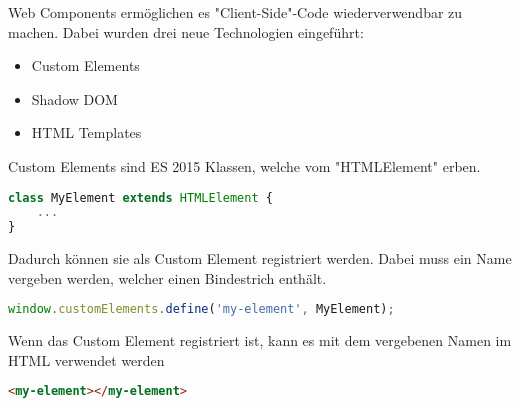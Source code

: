 

Web Components ermöglichen es "Client-Side"-Code wiederverwendbar zu machen. Dabei wurden drei neue Technologien eingeführt:

\begin{itemize}
    \item Custom Elements
    \item Shadow DOM
    \item HTML Templates
\end{itemize}

\cite{MDNWebComponents}


Custom Elements sind ES 2015 Klassen, welche vom "HTMLElement" erben. 

\begin{lstlisting}[language=TypeScript,caption={Erstellung einer Custom Element Klasse}]
class MyElement extends HTMLElement {
    ...
}
\end{lstlisting}

Dadurch können sie als Custom Element registriert werden. Dabei muss ein Name vergeben werden, welcher einen Bindestrich enthält.

\begin{lstlisting}[language=TypeScript,caption={Registrierung des Custom Elements},captionpos=b]
window.customElements.define('my-element', MyElement);
\end{lstlisting}

Wenn das Custom Element registriert ist, kann es mit dem vergebenen Namen im HTML verwendet werden

\begin{lstlisting}[language=HTML,caption={Verwendung des Custom Elements im HTML}]
<my-element></my-element>
\end{lstlisting}

